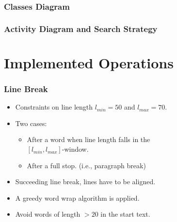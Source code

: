 \documentclass{beamer}
\begin{document}
\begin{frame}
\frametitle{Classes Diagram}
\end{frame}

\begin{frame}
\frametitle{Activity Diagram and Search Strategy}
\end{frame}

\section{Implemented Operations}

\begin{frame}
\frametitle{Line Break}


\begin{itemize}
\item Constraints on line length $l_{min}=50$ and $l_{max}=70.$



\item Two cases: 



\begin{itemize}
\item After a word when line length falls in the\\
 $[l_{min},l_{max}]$-window.
\item After a full stop. (i.e., paragraph break)
\end{itemize}


\item Succeeding line break, lines have to be aligned.

\item A greedy word wrap algorithm is applied. 

\item Avoid words of length $>20$ in the start text.
\end{itemize}

\end{frame}
\end{document}
